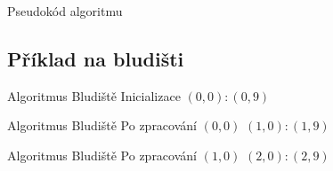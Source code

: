 \documentclass[11pt,professionalfont,aspectratio=43]{beamer}
\begin{document}
    \begin{frame}{Pseudokód algoritmu \Astar}
        \begin{center}
            \begin{minipage}{0.9\textwidth}
                \begin{algorithm}[H]
                    \caption{\Astar{} (pokračování)}
                    \setcounter{AlgoLine}{3}
                \end{algorithm}
            \end{minipage}
        \end{center}
    \end{frame}

    \subsection{Příklad na bludišti}

    \begin{frame}{Algoritmus \Astar}{Bludiště}
    \centering
    \AStarMazeState
        {Inicializace}
        {$(0,0):(0,9)$}
        {\AStarMazeTreeA}
        {\AStarMazeNodesA}
    \end{frame}

    \begin{frame}{Algoritmus \Astar}{Bludiště}
    \centering
    \AStarMazeState
        {Po zpracování $(0,0)$}
        {$(1,0):(1,9)$}
        {\AStarMazeTreeB}
        {\AStarMazeNodesB}
    \end{frame}

    \begin{frame}{Algoritmus \Astar}{Bludiště}
    \centering
    \AStarMazeState
        {Po zpracování $(1,0)$}
        {$(2,0):(2,9)$}
        {\AStarMazeTreeC}
        {\AStarMazeNodesC}
    \end{frame}
\end{document}

